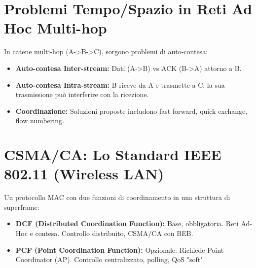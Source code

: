 \documentclass{article}
\begin{document}
\section{Problemi Tempo/Spazio in Reti Ad Hoc Multi-hop}
In catene multi-hop (A->B->C), sorgono problemi di auto-contesa:
\begin{itemize}
    \item \textbf{Auto-contesa Inter-stream:} Dati (A->B) vs ACK (B->A) attorno a B.
    \item \textbf{Auto-contesa Intra-stream:} B riceve da A e trasmette a C; la sua trasmissione può interferire con la ricezione.
    \item \textbf{Coordinazione:} Soluzioni proposte includono fast forward, quick exchange, flow numbering.
\end{itemize}

\section{CSMA/CA: Lo Standard IEEE 802.11 (Wireless LAN)}
Un protocollo MAC con due funzioni di coordinamento in una struttura di superframe:
\begin{itemize}
    \item \textbf{DCF (Distributed Coordination Function):} Base, obbligatoria. Reti Ad-Hoc e contesa. Controllo distribuito, CSMA/CA con BEB.
    \item \textbf{PCF (Point Coordination Function):} Opzionale. Richiede Point Coordinator (AP). Controllo centralizzato, polling, QoS "soft".
\end{itemize}
\end{document}
